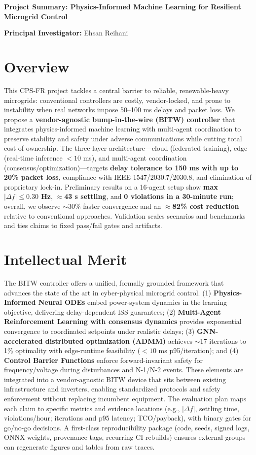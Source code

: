\documentclass[11pt]{article}
\begin{document}
\textbf{\large Project Summary: Physics-Informed Machine Learning for Resilient Microgrid Control}

\textbf{Principal Investigator:} Ehsan Reihani

\section*{Overview}

This CPS-FR project tackles a central barrier to reliable, renewable-heavy microgrids: conventional controllers are costly, vendor-locked, and prone to instability when real networks impose 50--100 ms delays and packet loss. We propose a \textbf{vendor-agnostic bump-in-the-wire (BITW) controller} that integrates physics-informed machine learning with multi-agent coordination to preserve stability and safety under adverse communications while cutting total cost of ownership. The three-layer architecture---cloud (federated training), edge (real-time inference $<10$ ms), and multi-agent coordination (consensus/optimization)---targets \textbf{delay tolerance to 150 ms with up to 20\% packet loss}, compliance with IEEE 1547/2030.7/2030.8, and elimination of proprietary lock-in. Preliminary results on a 16-agent setup show \textbf{max $|\Delta f| \leq 0.30$ Hz}, \textbf{$\approx$43 s settling}, and \textbf{0 violations in a 30-minute run}; overall, we observe $\sim$30\% faster convergence and an \textbf{$\approx$82\% cost reduction} relative to conventional approaches. Validation scales scenarios and benchmarks and ties claims to fixed pass/fail gates and artifacts.

\section*{Intellectual Merit}

The BITW controller offers a unified, formally grounded framework that advances the state of the art in cyber-physical microgrid control. (1) \textbf{Physics-Informed Neural ODEs} embed power-system dynamics in the learning objective, delivering delay-dependent ISS guarantees; (2) \textbf{Multi-Agent Reinforcement Learning with consensus dynamics} provides exponential convergence to coordinated setpoints under realistic delays; (3) \textbf{GNN-accelerated distributed optimization (ADMM)} achieves $\sim$17 iterations to 1\% optimality with edge-runtime feasibility ($<10$ ms p95/iteration); and (4) \textbf{Control Barrier Functions} enforce forward-invariant safety for frequency/voltage during disturbances and N-1/N-2 events. These elements are integrated into a vendor-agnostic BITW device that sits between existing infrastructure and inverters, enabling standardized protocols and safety enforcement without replacing incumbent equipment. The evaluation plan maps each claim to specific metrics and evidence locations (e.g., $|\Delta f|$, settling time, violations/hour; iterations and p95 latency; TCO/payback), with binary gates for go/no-go decisions. A first-class reproducibility package (code, seeds, signed logs, ONNX weights, provenance tags, recurring CI rebuilds) ensures external groups can regenerate figures and tables from raw traces.
\end{document}
